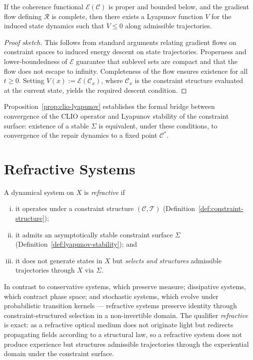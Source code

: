 \documentclass[11pt,openany]{book}
\begin{document}
\begin{proposition}
\label{prop:clio-lyapunov}
If the coherence functional $\mathcal{E}(\mathcal{C})$ is
proper and bounded below, and the gradient flow defining
$\mathcal{R}$ is complete, then there exists a Lyapunov
function $V$ for the induced state dynamics such that
$\dot{V} \le 0$ along admissible trajectories.
\end{proposition}

\begin{proof}[Proof sketch]
This follows from standard arguments relating gradient flows
on constraint spaces to induced energy descent on state
trajectories.  Properness and lower-boundedness of
$\mathcal{E}$ guarantee that sublevel sets are compact and
that the flow does not escape to infinity.  Completeness
of the flow ensures existence for all $t \ge 0$.  Setting
$V(x) := \mathcal{E}(\mathcal{C}_x)$, where $\mathcal{C}_x$
is the constraint structure evaluated at the current state,
yields the required descent condition.
\end{proof}

\begin{remark}
Proposition~\ref{prop:clio-lyapunov} establishes the formal
bridge between convergence of the CLIO operator and
Lyapunov stability of the constraint surface: existence of a
stable $\Sigma$ is equivalent, under these conditions, to
convergence of the repair dynamics to a fixed point
$\mathcal{C}^*$.
\end{remark}

\section{Refractive Systems}
\label{sec:refractive-systems}

\begin{definition}
\label{def:refractive-system}
A dynamical system on $X$ is \emph{refractive} if
\begin{enumerate}[(i)]
  \item it operates under a constraint structure
    $(\mathcal{C}, \mathcal{T})$
    (Definition~\ref{def:constraint-structure});
  \item it admits an asymptotically stable constraint surface
    $\Sigma$ (Definition~\ref{def:lyapunov-stability}); and
  \item it does not generate states in $X$ but
    \emph{selects and structures} admissible trajectories
    through $X$ via $\Sigma$.
\end{enumerate}
In contrast to conservative systems, which preserve measure;
dissipative systems, which contract phase space; and
stochastic systems, which evolve under probabilistic
transition kernels --- refractive systems preserve identity
through constraint-structured selection in a non-invertible
domain.  The qualifier \emph{refractive} is exact: as a
refractive optical medium does not originate light but
redirects propagating fields according to a structural law,
so a refractive system does not produce experience but
structures admissible trajectories through the experiential
domain under the constraint surface.
\end{definition}
\end{document}
